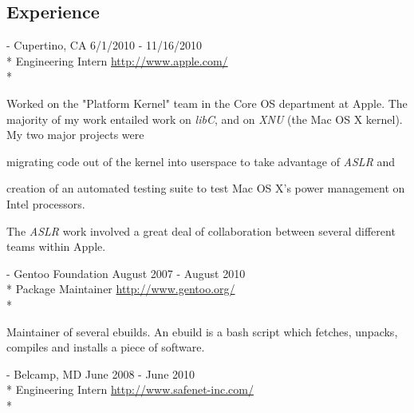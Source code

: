 \documentclass[a4paper,margin,line]{resume}
\newcommand{\rurl}[1]{\hfill {\footnotesize \url{#1}}}
\newcommand{\rdate}[1]{\hfill {\small #1}}
\renewcommand{\employer}[5]{\item[#1] - #2 \rdate{#3} \\* #4 \rurl{#5} \\*}
\begin{document}
\begin{resume}
\section{\mysidestyle Experience}
	\begin{asparadesc}
		
		\employer{Apple Inc}{Cupertino, CA}{6/1/2010 - 11/16/2010}{Engineering Intern}{http://www.apple.com/}

		\small
		Worked on the "Platform Kernel" team in the Core OS department at Apple. The majority of my work entailed work on \emph{libC}, and on \emph{XNU} (the Mac OS X kernel). My two major projects were \begin{inparaenum} \item migrating code out of the kernel into userspace to take advantage of \emph{ASLR} and \item creation of an automated testing suite to test Mac OS X's power management on Intel processors. \end{inparaenum} The \emph{ASLR} work involved a great deal of collaboration between several different teams within Apple.
		\normalsize
		\\
		\employer{Gentoo Linux}{Gentoo Foundation}{August 2007 - August 2010}{Package Maintainer}{http://www.gentoo.org/}

		\small
		Maintainer of several ebuilds. An ebuild is a bash script which fetches, unpacks, compiles and installs a piece of software.
		\normalsize
		\\
		\employer{SafeNet Inc}{Belcamp, MD}{June 2008 - June 2010}{Engineering Intern}{http://www.safenet-inc.com/}


\end{asparadesc}
\end{resume}
\end{document}
